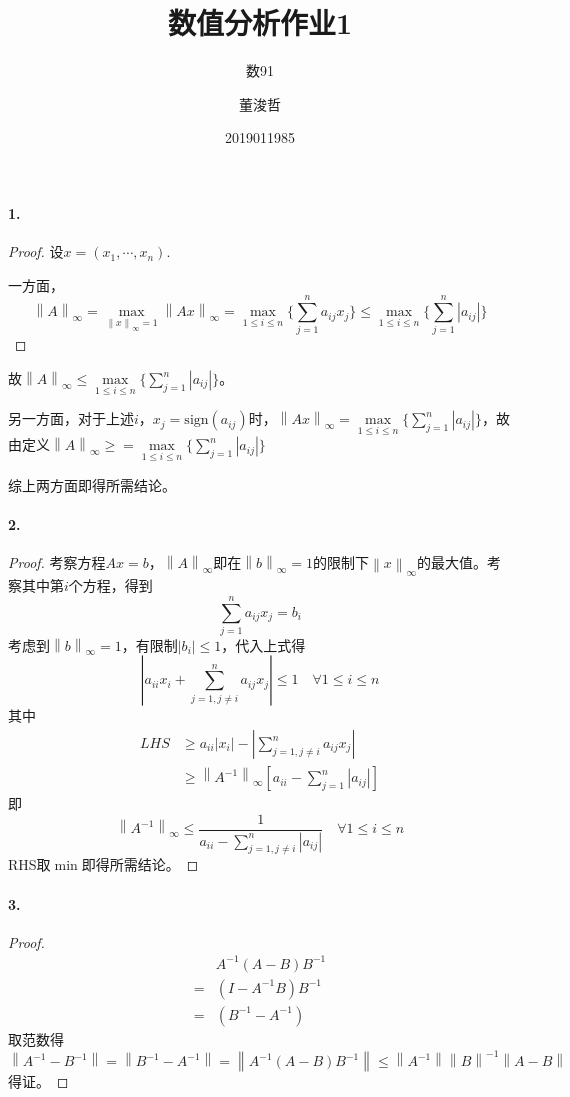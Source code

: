 \documentclass{ctexart}
\title{数值分析作业1}
\author{数91\and 董浚哲\and 2019011985}
\begin{document}
\maketitle
\newcommand{\R}{\mathbf{R}}
\newcommand{\dd}{\,\mathrm{d}}
\newcommand{\st}{\text{ s.t. }}
\newcommand{\pp}[2]{\frac{\partial #1}{\partial #2}}
\newcommand{\nm}[1]{\left\|#1\right\|}

\paragraph{1.}
\begin{proof}
设$x=(x_1,\cdots, x_n)$.

一方面，
\[\nm{A}_\infty=\max_{\nm{x}_\infty=1}\nm{Ax}_\infty=\max_{1\leq i\leq n}\{\sum_{j=1}^na_{ij}x_j\}\leq \max_{1\leq i\leq n}\{\sum_{j=1}^n |a_{ij}|\}\]
\end{proof}
故$\nm{A}_\infty\leq \max\limits_{1\leq i\leq n}\{\sum\limits_{j=1}^n |a_{ij}|\}$。

另一方面，对于上述$i$，$x_j=\mathrm{sign}(a_{ij})$时，$\nm{Ax}_\infty=\max\limits_{1\leq i\leq n}\{\sum_{j=1}^n |a_{ij}|\}$，故由定义$\nm{A}_\infty\geq =\max\limits_{1\leq i\leq n}\{\sum_{j=1}^n |a_{ij}|\}$

综上两方面即得所需结论。

\paragraph{2.}
\begin{proof}
考察方程$Ax=b$，$\nm{A}_\infty$即在$\nm{b}_\infty=1$的限制下$\nm{x}_\infty$的最大值。考察其中第$i$个方程，得到
\[\sum_{j=1}^na_{ij}x_j=b_i\]
考虑到$\nm{b}_\infty=1$，有限制$|b_i|\leq 1$，代入上式得
\[|a_{ii}x_i+\sum_{j=1,j\neq i}^n a_{ij}x_j|\leq 1\quad \forall 1\leq i\leq n\]
其中
\begin{align*}
LHS&\geq a_{ii}|x_i|-|\sum_{j=1,j\neq i}^n a_{ij}x_j|\\
&\geq \nm{A^{-1}}_\infty[a_{ii}-\sum_{j=1}^n|a_{ij}|]
\end{align*}
即
\[\nm{A^{-1}}_\infty\leq\frac{1}{a_{ii}-\sum\limits_{j=1,j\neq i}^n|a_{ij}|}\quad \forall 1\leq i\leq n\]
RHS取$\min$即得所需结论。
\end{proof}




\paragraph{3.}
\begin{proof}
\begin{align*}
&A^{-1}(A-B)B^{-1}\\
=&(I-A^{-1}B)B^{-1}\\
=&(B^{-1}-A^{-1})
\end{align*}
取范数得
\[\nm{A^{-1}-B^{-1}}=\nm{B^{-1}-A^{-1}}=\nm{A^{-1}(A-B)B^{-1}}\leq \nm{A^{-1}}\nm{B}^{-1}\nm{A-B}\]
得证。
\end{proof}
\end{document}
